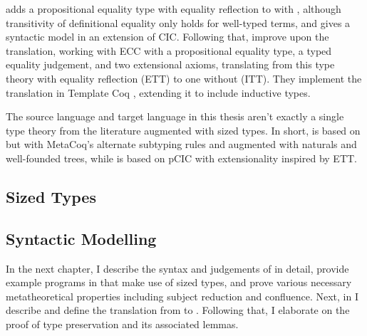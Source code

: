 \citet{CCE} adds a propositional equality type with equality reflection to \GCC with ,
although transitivity of definitional equality only holds for well-typed terms,
and gives a syntactic model in an extension of CIC.
Following that, \citet{CICE} improve upon the translation,
working with ECC with a propositional equality type, a typed equality judgement,
and two extensional axioms,
translating from this type theory with equality reflection (ETT) to one without (ITT).
They implement the translation in Template Coq \citep{TemplateCoq},
extending it to include inductive types.


The source language \lang and target language \CICE in this thesis aren't exactly
a single type theory from the literature augmented with sized types.
In short, \lang is based on \GCC but with MetaCoq's alternate subtyping rules
and augmented with naturals and well-founded trees,
while \CICE is based on pCIC with extensionality inspired by ETT.

\subsection{Sized Types}

\TODO

\subsection{Syntactic Modelling}

\TODO

\hfill \newline
\noindent In the next chapter, I describe the syntax and judgements of \lang in detail,
provide example programs in \lang that make use of sized types,
and prove various necessary metatheoretical properties including subject reduction and confluence.
Next, in \TODO I describe \CICE and define the translation from \lang to \CICE.
Following that, I elaborate on the proof of type preservation and its associated lemmas.
